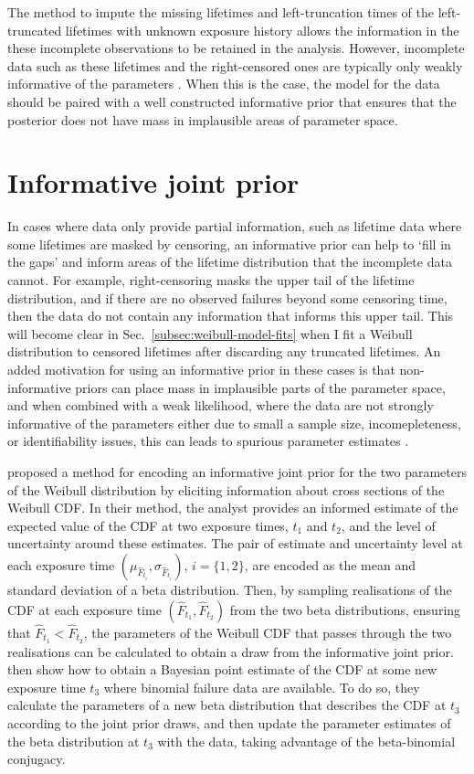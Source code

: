The method to impute the missing lifetimes and left-truncation times of the left-truncated lifetimes with unknown exposure history allows the information in the these incomplete observations to be retained in the analysis. However, incomplete data such as these lifetimes and the right-censored ones are typically only weakly informative of the parameters \citep{tian2024}. When this is the case, the model for the data should be paired with a well constructed informative prior that ensures that the posterior does not have mass in implausible areas of parameter space. 

\section{Informative joint prior} \label{sec:weibull-joint-prior}

In cases where data only provide partial information, such as lifetime data where some lifetimes are masked by censoring, an informative prior can help to `fill in the gaps' and inform areas of the lifetime distribution that the incomplete data cannot. For example, right-censoring masks the upper tail of the lifetime distribution, and if there are no observed failures beyond some censoring time, then the data do not contain any information that informs this upper tail. This will become clear in Sec.~\ref{subsec:weibull-model-fits} when I fit a Weibull distribution to censored lifetimes after discarding any truncated lifetimes. An added motivation for using an informative prior in these cases is that non-informative priors can place mass in implausible parts of the parameter space, and when combined with a weak likelihood, where the data are not strongly informative of the parameters either due to small a sample size, incomepleteness, or identifiability issues, this can leads to spurious parameter estimates \citep{tian2024}.

\citet{kaminskiy2005} proposed a method for encoding an informative joint prior for the two parameters of the Weibull distribution by eliciting information about cross sections of the Weibull CDF. In their method, the analyst provides an informed estimate of the expected value of the CDF at two exposure times, $t_1$ and $t_2$, and the level of uncertainty around these estimates. The pair of estimate and uncertainty level at each exposure time $(\mu_{\hat{F}_{t_i}}, \sigma_{\hat{F}_{t_i}})$, $i = \{1, 2\}$, are encoded as the mean and standard deviation of a beta distribution. Then, by sampling realisations of the CDF at each exposure time $(\hat{F}_{t_1}, \hat{F}_{t_2})$ from the two beta distributions, ensuring that $\hat{F}_{t_1} < \hat{F}_{t_2}$, the parameters of the Weibull CDF that passes through the two realisations can be calculated to obtain a draw from the informative joint prior. \citet{kaminskiy2005} then show how to obtain a Bayesian point estimate of the CDF at some new exposure time $t_3$ where binomial failure data are available. To do so, they calculate the parameters of a new beta distribution that describes the CDF at $t_3$ according to the joint prior draws, and then update the parameter estimates of the beta distribution at $t_3$ with the data, taking advantage of the beta-binomial conjugacy.

